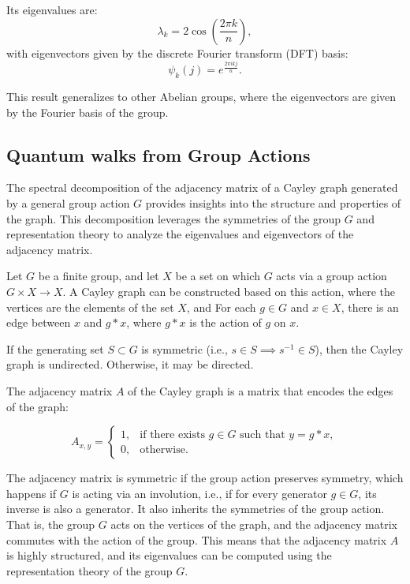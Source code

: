 \documentclass[11pt]{article}
\theoremstyle{definition}
\begin{document}
Its eigenvalues are:
\[
\lambda_k = 2\cos\left(\frac{2\pi k}{n}\right),
\]
with eigenvectors given by the discrete Fourier transform (DFT) basis:
\[
\psi_k(j) = e^{\frac{2\pi i k j}{n}}.
\]

This result generalizes to other Abelian groups, where the eigenvectors are given by the Fourier basis of the group.



\subsection*{Quantum walks from Group Actions}
The spectral decomposition of the adjacency matrix of a Cayley graph generated by a general group action $G$ provides insights into the structure and properties of the graph. This decomposition leverages the symmetries of the group $G$ and representation theory to analyze the eigenvalues and eigenvectors of the adjacency matrix.

  
Let $G$ be a finite group, and let $X$ be a set on which $G$ acts via a group action $G \times X \to X$. A Cayley graph can be constructed based on this action, where
the vertices are the elements of the set $X$, and For each $g \in G$ and $x \in X$, there is an edge between $x$ and $g *	x$, where $g * x$ is the action of $g$ on $x$.


If the generating set $S \subset G$ is symmetric (i.e., $s \in S \implies s^{-1} \in S$), then the Cayley graph is undirected. Otherwise, it may be directed.



The adjacency matrix $A$ of the Cayley graph is a matrix that encodes the edges of the graph:

\[
A_{x,y} =
\begin{cases}
1, & \text{if there exists } g \in G \text{ such that } y = g * x, \\
0, & \text{otherwise}.
\end{cases}
\]

The adjacency matrix is symmetric if the group action preserves symmetry, which happens if $G$ is acting via an involution, i.e., if for every generator $g \in G$, its inverse is also a generator. It also inherits the symmetries of the group action. That is, the group $G$ acts on the vertices of the graph, and the adjacency matrix commutes with the action of the group. This means that the adjacency matrix $A$ is highly structured, and its eigenvalues can be computed using the representation theory of the group $G$.
\end{document}
